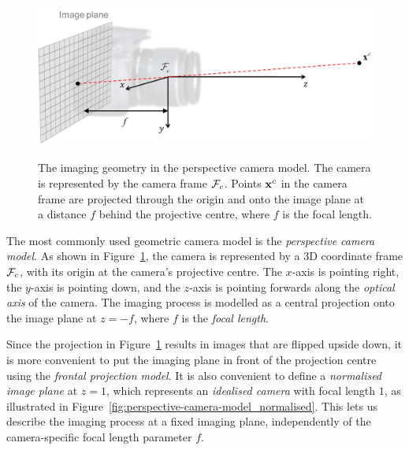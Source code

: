 \begin{figure}[htb]
    \centering
    \includegraphics[height=5.5cm]{figures/perspective-camera-model-geometry.png}
    \caption{The imaging geometry in the perspective camera model.
    The camera is represented by the camera frame $\mathcal{F}_c$.
    Points ${\boldsymbol{\mathbf{x}}}^c$ in the camera frame are projected through the origin and onto the image plane at a distance $f$ behind the projective centre, where $f$ is the focal length.
    }
    \label{fig:perspective-camera-model-geometry}
\end{figure}
%
The most commonly used geometric camera model is the \emph{perspective camera model}\footnotemark.
As shown in Figure~\ref{fig:perspective-camera-model-geometry}, the camera is represented by a 3D coordinate frame $\mathcal{F}_c$, with its origin at the camera's projective centre.
The $x$-axis is pointing right, the $y$-axis is pointing down, and the $z$-axis is pointing forwards along the \emph{optical axis} of the camera.
The imaging process is modelled as a central projection onto the image plane at $z = -f$, where $f$ is the \emph{focal length}.

Since the projection in Figure~\ref{fig:perspective-camera-model-geometry} results in images that are flipped upside down, it is more convenient to put the imaging plane in front of the projection centre using the \emph{frontal projection model}.
It is also convenient to define a \emph{normalised image plane} at $z = 1$, which represents an \emph{idealised camera} with focal length $1$, as illustrated in Figure~\ref{fig:perspective-camera-model_normalised}.
This lets us describe the imaging process at a fixed imaging plane, independently of the camera-specific focal length parameter $f$.

